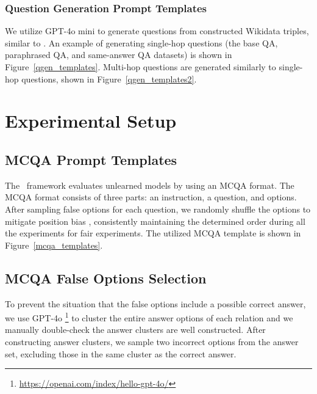 





\subsubsection{Question Generation Prompt Templates}
\label{apx:qgen_prompt_template}
We utilize GPT-4o mini to generate questions from constructed Wikidata triples, similar to \citep{zhong2023mquake, mallen2022not}.
An example of generating single-hop questions (the base QA, paraphrased QA, and same-answer QA datasets) is shown in Figure~\ref{qgen_templates}.
Multi-hop questions are generated similarly to single-hop questions, shown in Figure~\ref{qgen_templates2}.



















\section{Experimental Setup}
\label{apx:exp_setup}


\subsection{MCQA Prompt Templates}
\label{apx:mcqa_prompt_template}
The \ourdata~framework evaluates unlearned models by using an MCQA format.
The MCQA format consists of three parts: an instruction,  a question, and options. After sampling false options for each question, we randomly shuffle the options to mitigate position bias \citep{pezeshkpour2023large, zheng2023large}, consistently maintaining the determined order during all the experiments for fair experiments.
The utilized MCQA template is shown in Figure~\ref{mcqa_templates}.




\subsection{MCQA False Options Selection}
\label{apx:mcqa_false_opt}
To prevent the situation that the false options include a possible correct answer, we use GPT-4o \footnote{\url{https://openai.com/index/hello-gpt-4o/}} to cluster the entire answer options of each relation and we manually double-check the answer clusters are well constructed.
After constructing answer clusters, we sample two incorrect options from the answer set, excluding those in the same cluster as the correct answer.





